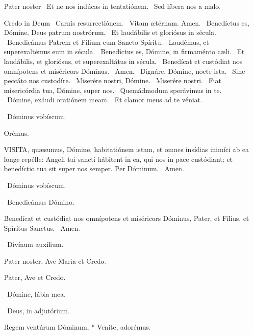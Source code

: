 Pater noster  \V\ Et ne nos indúcas in tentatiónem. \R\ Sed líbera nos a malo.

Credo in Deum  \V\ Carnis resurrectiónem. \R\ Vitam ætérnam. Amen. \V\ Benedíctus es, Dómine, Deus patrum nostrórum. \R\ Et laudábilis et gloriósus in sécula. \V\ Benedicámus Patrem et Fílium cum Sancto Spíritu. \R\ Laudémus, et superexaltémus eum in sécula. \V\ Benedíctus es, Dómine, in firmaménto cæli. \R\ Et laudábilis, et gloriósus, et superexaltátus in sécula. \V\ Benedícat et custódiat nos omnípotens et miséricors Dóminus. \R\ Amen. \V\ Dignáre, Dómine, nocte ista. \R\ Sine peccáto nos custodíre. \V\ Miserére nostri, Dómine. \R\ Miserére nostri. \V\ Fiat misericórdia tua, Dómine, super nos. \R\ Quemádmodum sperávimus in te. \V\ Dómine, exáudi oratiónem meam. \R\ Et clamor meus ad te véniat.

\sectionornament

\V\ Dóminus vobíscum.

Orémus. 

\lettrine[lines=2]{V}{ISITA}, quæsumus, Dómine, habitatiónem istam, et omnes insídias inimíci ab ea longe repélle: Angeli tui sancti hábitent in ea, qui nos in pace custódiant; et benedíctio tua sit super nos semper. Per Dóminum. \R\ Amen.

\V\ Dóminus vobíscum.

\V\ Benedicámus Dómino.

 Benedícat et custódiat nos omnípotens et miséricors Dóminus, Pater, et Fílius, et Spíritus Sanctus. \R\ Amen.


\V\ Divínum auxílium.

Pater noster, Ave María et Credo.

\sectionornament



Pater, Ave et Credo.

\V\ Dómine, lábia mea.

\V\ Deus, in adjutórium.



 Regem ventúrum Dóminum, * Veníte, adorémus.


